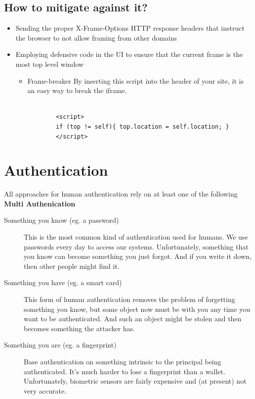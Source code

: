 \documentclass[a4paper, titlepage]{article}
\begin{document}
\subsection{How to mitigate against it?}

\begin{itemize}
    \item Sending the proper X-Frame-Options HTTP response headers that instruct the browser to not allow framing from other domains
    \item Employing defensive code in the UI to ensure that the current frame is the most top level window
    \begin{itemize}
        \item Frame-breaker
        By inserting this script into the header of your site, it is an easy way to break the iframe.
        \begin{lstlisting}

        <script>
        if (top != self){ top.location = self.location; }
        </script>

        \end{lstlisting}
    \end{itemize}
\end{itemize}
\newpage

\section{Authentication}
All approaches for human authentication rely on at least one of the following
\newline
\newline
\textbf{Multi Authenication}
\begin{description}
    \item[Something you know (eg. a password)] This is the most common kind of authentication used for humans. We use passwords every day to access our systems. Unfortunately, something that you know can become something you just forgot. And if you write it down, then other people might find it.
    \item [Something you have (eg. a smart card)] This form of human authentication removes the problem of forgetting something you know, but some object now must be with you any time you want to be authenticated. And such an object might be stolen and then becomes something the attacker has.
    \item [Something you are (eg. a fingerprint)] Base authentication on something intrinsic to the principal being authenticated. It's much harder to lose a fingerprint than a wallet. Unfortunately, biometric sensors are fairly expensive and (at present) not very accurate.
\end{description}
\end{document}
